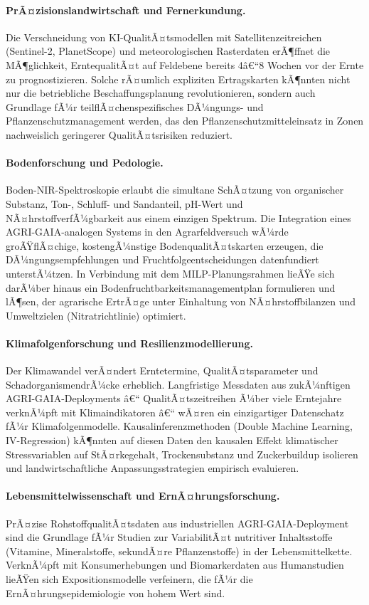 ﻿\documentclass[12pt,a4paper]{article}
\theoremstyle{plain}
\theoremstyle{definition}
\begin{document}
	\paragraph{PrÃ¤zisionslandwirtschaft und Fernerkundung.}
	Die Verschneidung von KI-QualitÃ¤ts\-modellen mit Satellitenzeitreichen
	(Sentinel-2, PlanetScope) und meteorologischen Raster\-daten erÃ¶ffnet die
	MÃ¶glichkeit, ErntequalitÃ¤t auf Feldebene bereits 4â€“8 Wochen vor der Ernte
	zu prognostizieren. Solche rÃ¤umlich expliziten Ertragskarten kÃ¶nnten
	nicht nur die betriebliche Beschaffungsplanung revolutionieren, sondern
	auch Grundlage fÃ¼r teilflÃ¤chenspezifisches DÃ¼ngungs- und
	Pflanzenschutzmanagement werden, das den Pflanzenschutzmitteleinsatz
	in Zonen nachweislich geringerer QualitÃ¤tsrisiken reduziert.

	\paragraph{Bodenforschung und Pedologie.}
	Boden-NIR-Spektroskopie erlaubt die simultane SchÃ¤tzung von organischer
	Substanz, Ton-, Schluff- und Sandanteil, pH-Wert und
	NÃ¤hrstoffverfÃ¼gbarkeit aus einem einzigen Spektrum. Die Integration
	eines AGRI-GAIA-analogen Systems in den Agrarfeldversuch wÃ¼rde
	groÃŸflÃ¤chige, kostengÃ¼nstige BodenqualitÃ¤tskarten erzeugen, die
	DÃ¼ngungsempfehlungen und Fruchtfolgeentscheidungen datenfundiert
	unterstÃ¼tzen. In Verbindung mit dem MILP-Planungsrahmen lieÃŸe sich
	darÃ¼ber hinaus ein Bodenfruchtbarkeitsmanagementplan formulieren und
	lÃ¶sen, der agrarische ErtrÃ¤ge unter Einhaltung von NÃ¤hrstoffbilanzen
	und Umweltzielen (Nitratrichtlinie) optimiert.

	\paragraph{Klimafolgenforschung und Resilienzmodellierung.}
	Der Klimawandel verÃ¤ndert Erntetermine, QualitÃ¤tsparameter und
	SchadorganismendrÃ¼cke erheblich. Langfristige Messdaten aus zukÃ¼nftigen
	AGRI-GAIA-Deployments â€“ QualitÃ¤tszeitreihen Ã¼ber viele Erntejahre
	verknÃ¼pft mit Klimaindikatoren â€“ wÃ¤ren ein einzigartiger Datenschatz
	fÃ¼r Klimafolgenmodelle. Kausalinferenzmethoden (Double Machine Learning,
	IV-Regression) kÃ¶nnten auf diesen Daten den kausalen Effekt
	klimatischer Stressvariablen auf StÃ¤rkegehalt, Trockensubstanz und
	Zuckerbuildup isolieren und landwirtschaftliche Anpassungsstrategien
	empirisch evaluieren.

	\paragraph{Lebensmittelwissenschaft und ErnÃ¤hrungsforschung.}
	PrÃ¤zise RohstoffqualitÃ¤tsdaten aus industriellen AGRI-GAIA-Deployment sind
	die Grundlage fÃ¼r Studien zur VariabilitÃ¤t nutritiver Inhaltsstoffe
	(Vitamine, Mineralstoffe, sekundÃ¤re Pflanzenstoffe) in der Lebensmittelkette.
	VerknÃ¼pft mit Konsumerhebungen und Biomarkerdaten aus Humanstudien
	lieÃŸen sich Expositionsmodelle verfeinern, die fÃ¼r die
	ErnÃ¤hrungsepidemiologie von hohem Wert sind.
\end{document}
